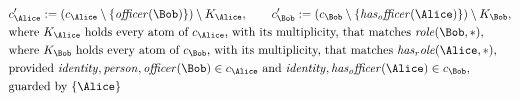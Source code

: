 \begin{align*}
&
c'_
{
\Alice
}
 := 
(c_
{
\Alice
}
 \setminus 
\{
\mathit{
officer
}
(
\Bob
)
\}
) \setminus K_
{
\Alice
}
, \qquad 
c'_
{
\Bob
}
 := 
(c_
{
\Bob
}
 \setminus 
\{
\mathit{
has_officer
}
(
\Alice
)
\}
) \setminus K_
{
\Bob
}
,\\
&
\text{where } K_
{
\Alice
}
 \text{ holds every atom of } c_
{
\Alice
}
 \text{, with its multiplicity, that matches } 
\mathit{
role
}
(
\Bob
,
\ast
)
,\\
&
\text{where } K_
{
\Bob
}
 \text{ holds every atom of } c_
{
\Bob
}
 \text{, with its multiplicity, that matches } 
\mathit{
has_role
}
(
\Alice
,
\ast
)
,\\
&
\text{provided } 
\mathit{
identity
}
,
\mathit{
person
}
,
\mathit{
officer
}
(
\Bob
)
 \in c_
{
\Alice
}
 \text{ and } 
\mathit{
identity
}
,
\mathit{
has_officer
}
(
\Alice
)
 \in c_
{
\Bob
}
,\\
&
\text{guarded by } \{
\Alice
\}
\end{align*}

